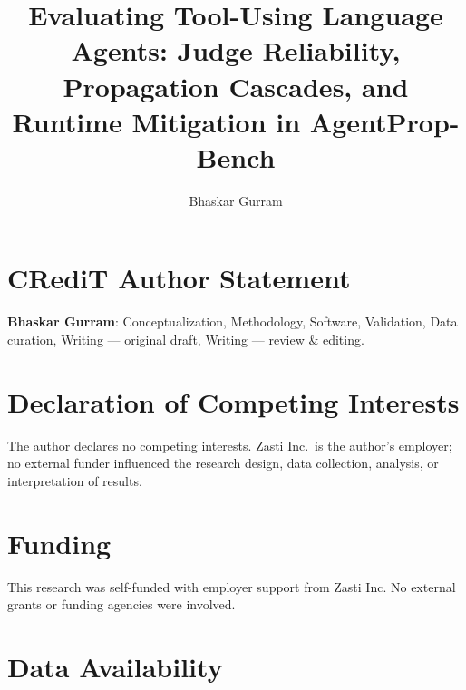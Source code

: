\documentclass[preprint,review,12pt]{elsarticle}
\begin{document}
\begin{frontmatter}

\title{Evaluating Tool-Using Language Agents: Judge Reliability,\\
Propagation Cascades, and Runtime Mitigation in AgentProp-Bench}

\author[zasti]{Bhaskar Gurram}



\end{frontmatter}

\section*{CRediT Author Statement}

\textbf{Bhaskar Gurram}: Conceptualization, Methodology, Software,
Validation, Data curation, Writing --- original draft,
Writing --- review \& editing.

\section*{Declaration of Competing Interests}

The author declares no competing interests.
Zasti Inc.\ is the author's employer; no external funder influenced
the research design, data collection, analysis, or interpretation of results.

\section*{Funding}

This research was self-funded with employer support from Zasti Inc.
No external grants or funding agencies were involved.

\section*{Data Availability}
\end{document}
